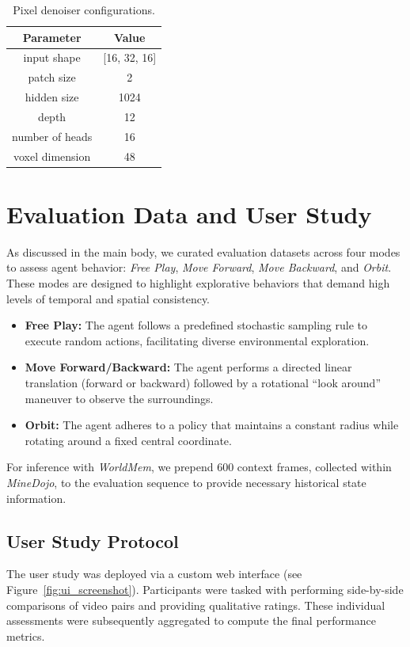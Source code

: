 \documentclass{article}
\theoremstyle{plain}
\theoremstyle{definition}
\theoremstyle{remark}
\begin{document}
\begin{table}[htb!]
\centering
\begin{tabular}{cc}\toprule  
Parameter & Value \\
\midrule
input shape & [16, 32, 16] \\
patch size & 2 \\
hidden size & 1024 \\
depth & 12 \\
number of heads & 16 \\
voxel dimension & 48 \\
\bottomrule
\end{tabular}\caption{Pixel denoiser configurations.}
\label{table:pixel-denoiser}
\end{table}

\clearpage
\section{Evaluation Data and User Study}\label{app:data}

As discussed in the main body, we curated evaluation datasets across four modes to assess agent behavior: \textit{Free Play}, \textit{Move Forward}, \textit{Move Backward}, and \textit{Orbit}.
These modes are designed to highlight explorative behaviors that demand high levels of temporal and spatial consistency.

\begin{itemize}
    \item \textbf{Free Play:} The agent follows a predefined stochastic sampling rule to execute random actions, facilitating diverse environmental exploration.
    \item \textbf{Move Forward/Backward:} The agent performs a directed linear translation (forward or backward) followed by a rotational ``look around'' maneuver to observe the surroundings.
    \item \textbf{Orbit:} The agent adheres to a policy that maintains a constant radius while rotating around a fixed central coordinate.
\end{itemize}

For inference with \textit{WorldMem}, we prepend 600 context frames, collected within \textit{MineDojo}, to the evaluation sequence to provide necessary historical state information.

\subsection{User Study Protocol}
The user study was deployed via a custom web interface (see Figure~\ref{fig:ui_screenshot}). Participants were tasked with performing side-by-side comparisons of video pairs and providing qualitative ratings. These individual assessments were subsequently aggregated to compute the final performance metrics.
\end{document}

